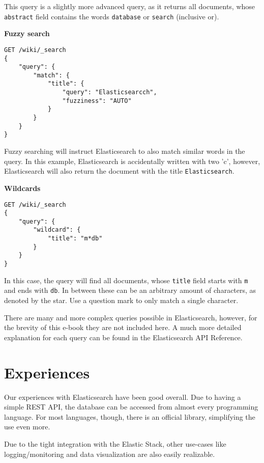This query is a slightly more advanced query, as it returns all documents, whose \texttt{abstract} field contains the words \texttt{database} or \texttt{search} (inclusive or).

\bigskip

\begin{minipage}[c]{0.95\textwidth}
    \textbf{Fuzzy search}
    \begin{lstlisting}
GET /wiki/_search
{
    "query": {
        "match": {
            "title": {
                "query": "Elasticsearcch",
                "fuzziness": "AUTO"
            }
        }
    }
}
    \end{lstlisting}
\end{minipage}

Fuzzy searching will instruct Elasticsearch to also match similar words in the query. In this example, Elasticsearch is accidentally written with two 'c', however, Elasticsearch will also return the document with the title \texttt{Elasticsearch}.

\bigskip

\begin{minipage}[c]{0.95\textwidth}
    \textbf{Wildcards}
    \begin{lstlisting}
GET /wiki/_search
{
    "query": {
        "wildcard": {
            "title": "m*db"
        }
    }
}
    \end{lstlisting}
\end{minipage}

In this case, the query will find all documents, whose \texttt{title} field starts with \texttt{m} and ends with \texttt{db}. In between these can be an arbitrary amount of characters, as denoted by the star. Use a question mark to only match a single character.

There are many and more complex queries possible in Elasticsearch, however, for the brevity of this e-book they are not included here. A much more detailed explanation for each query can be found in the Elasticsearch API Reference.

\section{Experiences}
Our experiences with Elasticsearch have been good overall. Due to having a simple REST API, the database can be accessed from almost every programming language. For most languages, though, there is an official library, simplifying the use even more.

Due to the tight integration with the Elastic Stack, other use-cases like logging/monitoring and data visualization are also easily realizable.
